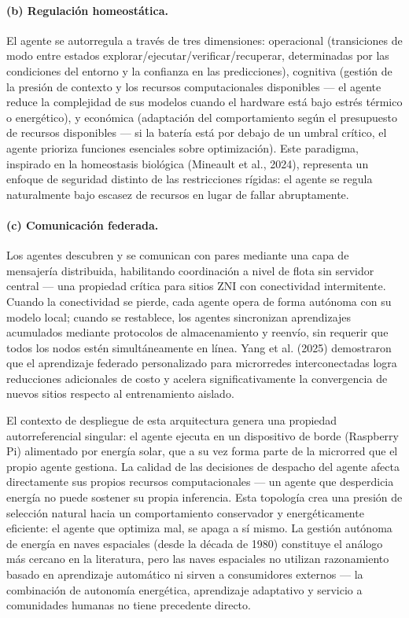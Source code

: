 \documentclass[12pt,letterpaper]{article}
\begin{document}
\paragraph{(b) Regulaci\'on homeost\'atica.}
El agente se autorregula a trav\'es de tres dimensiones: operacional (transiciones de modo entre estados explorar/ejecutar/verificar/recuperar, determinadas por las condiciones del entorno y la confianza en las predicciones), cognitiva (gesti\'on de la presi\'on de contexto y los recursos computacionales disponibles --- el agente reduce la complejidad de sus modelos cuando el hardware est\'a bajo estr\'es t\'ermico o energ\'etico), y econ\'omica (adaptaci\'on del comportamiento seg\'un el presupuesto de recursos disponibles --- si la bater\'ia est\'a por debajo de un umbral cr\'itico, el agente prioriza funciones esenciales sobre optimizaci\'on). Este paradigma, inspirado en la homeostasis biol\'ogica (Mineault et al., 2024), representa un enfoque de seguridad distinto de las restricciones r\'igidas: el agente se regula naturalmente bajo escasez de recursos en lugar de fallar abruptamente.

\paragraph{(c) Comunicaci\'on federada.}
Los agentes descubren y se comunican con pares mediante una capa de mensajer\'ia distribuida, habilitando coordinaci\'on a nivel de flota sin servidor central --- una propiedad cr\'itica para sitios ZNI con conectividad intermitente. Cuando la conectividad se pierde, cada agente opera de forma aut\'onoma con su modelo local; cuando se restablece, los agentes sincronizan aprendizajes acumulados mediante protocolos de almacenamiento y reenv\'io, sin requerir que todos los nodos est\'en simult\'aneamente en l\'inea. Yang et al. (2025) demostraron que el aprendizaje federado personalizado para microrredes interconectadas logra reducciones adicionales de costo y acelera significativamente la convergencia de nuevos sitios respecto al entrenamiento aislado.

\medskip

El contexto de despliegue de esta arquitectura genera una propiedad autorreferencial singular: el agente ejecuta en un dispositivo de borde (Raspberry Pi) alimentado por energ\'ia solar, que a su vez forma parte de la microrred que el propio agente gestiona. La calidad de las decisiones de despacho del agente afecta directamente sus propios recursos computacionales --- un agente que desperdicia energ\'ia no puede sostener su propia inferencia. Esta topolog\'ia crea una presi\'on de selecci\'on natural hacia un comportamiento conservador y energ\'eticamente eficiente: el agente que optimiza mal, se apaga a s\'i mismo. La gesti\'on aut\'onoma de energ\'ia en naves espaciales (desde la d\'ecada de 1980) constituye el an\'alogo m\'as cercano en la literatura, pero las naves espaciales no utilizan razonamiento basado en aprendizaje autom\'atico ni sirven a consumidores externos --- la combinaci\'on de autonom\'ia energ\'etica, aprendizaje adaptativo y servicio a comunidades humanas no tiene precedente directo.
\end{document}
